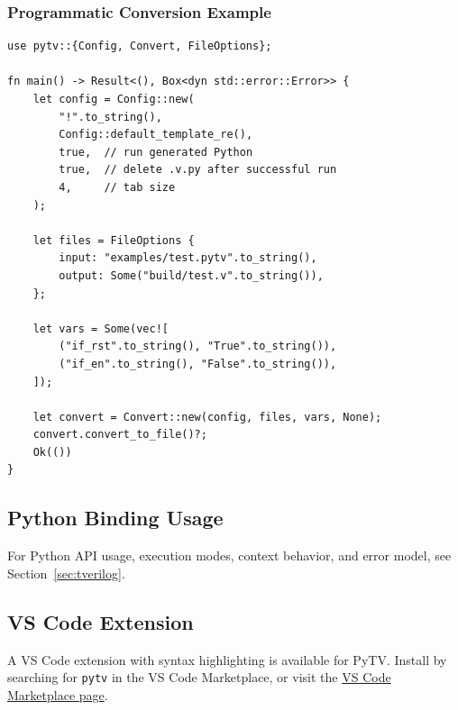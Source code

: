 \subsubsection*{Programmatic Conversion Example}
\begin{verbatim}
use pytv::{Config, Convert, FileOptions};

fn main() -> Result<(), Box<dyn std::error::Error>> {
    let config = Config::new(
        "!".to_string(),
        Config::default_template_re(),
        true,  // run generated Python
        true,  // delete .v.py after successful run
        4,     // tab size
    );

    let files = FileOptions {
        input: "examples/test.pytv".to_string(),
        output: Some("build/test.v".to_string()),
    };

    let vars = Some(vec![
        ("if_rst".to_string(), "True".to_string()),
        ("if_en".to_string(), "False".to_string()),
    ]);

    let convert = Convert::new(config, files, vars, None);
    convert.convert_to_file()?;
    Ok(())
}
\end{verbatim}

\subsection{Python Binding Usage}
For Python API usage, execution modes, context behavior, and error model,
see Section~\ref{sec:tverilog}.

\subsection{VS Code Extension}
A VS Code extension with syntax highlighting is available for PyTV.
Install by searching for \texttt{pytv} in the VS Code Marketplace,
or visit the
\href{https://marketplace.visualstudio.com/items?itemName=Teddy-van-Jerry.pytv}{VS Code Marketplace page}.
